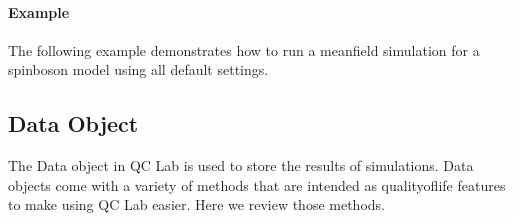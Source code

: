 \documentclass[letterpaper,10pt,english]{sphinxmanual}
\begin{document}
\paragraph{Example}
\label{\detokenize{user_guide/algorithms/fssh_algorithm:example}}
\sphinxAtStartPar
The following example demonstrates how to run a mean\sphinxhyphen{}field simulation for a spin\sphinxhyphen{}boson model using all default settings.

\begin{sphinxVerbatim}[commandchars=\\\{\}]
   
    
    
    
    

  
  
  
 \PYG{p}{[} \PYG{p}{]} 
  
\end{sphinxVerbatim}

\sphinxstepscope


\subsection{Data Object}
\label{\detokenize{user_guide/data_object:data-object}}\label{\detokenize{user_guide/data_object:id1}}\label{\detokenize{user_guide/data_object::doc}}
\sphinxAtStartPar
The Data object in QC Lab is used to store the results of simulations. Data objects come with a variety of methods that are intended as
quality\sphinxhyphen{}of\sphinxhyphen{}life features to make using QC Lab easier. Here we review those methods.
\end{document}
